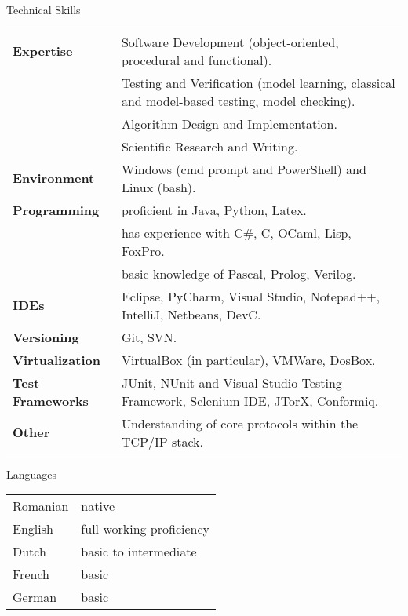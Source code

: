 \documentclass{resume} %
\begin{document}
\begin{rSection}{Technical Skills}
\begin{tabular}{@{} >{\bfseries}l @{\hspace{2ex}} >{\small}l}
\small{Expertise} 
& Software Development  {\footnotesize(object-oriented, procedural and functional)}. \\[0.2em]
& Testing and Verification {\footnotesize (model learning, classical and model-based testing, model checking)}. \\[0.2em]
& Algorithm Design and Implementation. \\[0.2em]
& Scientific Research and Writing. \\[0.7em]
\small{Environment} & Windows (cmd prompt and PowerShell) and Linux (bash). \\[0.7em] 
\small{Programming} & proficient in Java, Python, Latex. \\[0.2em]
& has experience with C\#, C, OCaml, Lisp, FoxPro.\\[0.2em]
& basic knowledge of Pascal, Prolog, Verilog.\\[0.7em]
\small{IDEs} & Eclipse, PyCharm, Visual Studio, Notepad++, IntelliJ, Netbeans, DevC. \\[0.7em]
\small{Versioning} & Git, SVN. \\[0.7em]
\small{Virtualization} & VirtualBox (in particular), VMWare, DosBox. \\[0.7em]
\small{Test Frameworks} & JUnit, NUnit and Visual Studio Testing Framework, Selenium IDE, JTorX, Conformiq. \\[0.7em]
\small{Other} & Understanding of core protocols within the TCP/IP stack. 
\end{tabular}
\end{rSection}


\begin{rSection}{Languages}
\begin{tabular}{ l @{\hspace{6ex}} l }
Romanian & native \\
English & full working proficiency \\
Dutch & basic to intermediate \\
French & basic \\
German & basic \\
\end{tabular}
\end{rSection}
\end{document}

